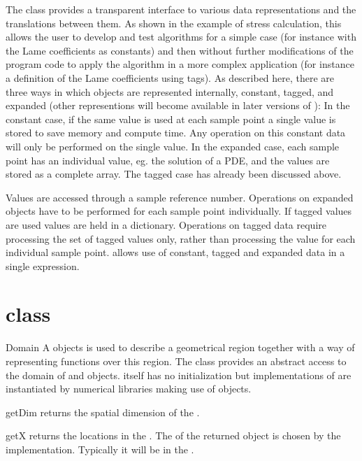 The \Data class provides a transparent interface to various data representations and the 
translations between them. As shown in the example of stress calculation, this allows the user to
develop and test algorithms for a simple case (for instance with the Lame coefficients as constants)
and then without further modifications of the program code to apply the algorithm in a
more complex application (for instance a definition of the Lame coefficients using tags). 
As described here, there are three ways in which \Data objects are represented internally, constant, tagged, and expanded (other representions will become available in later versions of \escript):
In the constant case, if the same value is used at each sample point a single value is stored to save memory and compute time. 
Any operation on this constant data will only be performed on the single value. 
In the expanded case, each sample point has an individual value, eg. the solution of a PDE,
and the values are stored as a complete array. The tagged case has already been discussed above.
 
Values are accessed through a sample reference number. Operations on expanded \Data
objects have to be performed for each sample point individually. If tagged values are used values are
held in a dictionary. Operations on tagged data require processing the set of tagged values only, rather than 
processing the value for each individual sample point. 
\escript allows use of constant, tagged and expanded data in a single expression.



\section{\Domain class}

\begin{classdesc}{Domain}{}
A \Domain objects is used to describe a geometrical region together with 
a way of representing functions over this region.
The \Domain class provides an abstract access to the domain of \FunctionSpace and \Data objects. 
\Domain itself has no initialization but implementations of \Domain are 
instantiated by numerical libraries making use of \Data objects. 
\end{classdesc}

\begin{methoddesc}[Domain]{getDim}{}
returns the spatial dimension of the \Domain.
\end{methoddesc}

\begin{methoddesc}[Domain]{getX}{}
returns the locations in the \Domain. The \FunctionSpace of the returned
\Data object is chosen by the \Domain implementation. Typically it will be
in the \Function.
\end{methoddesc}

